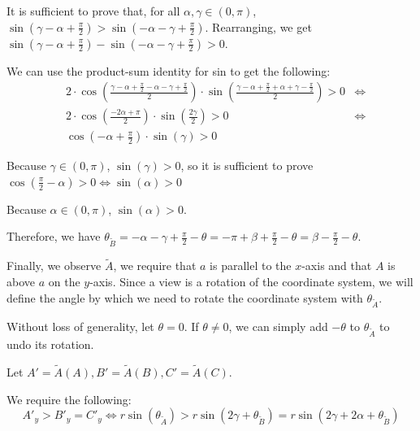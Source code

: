 \documentclass[a4paper,12pt]{article}
\newcommand{\HSview}[1][V]{\widetilde{#1}}
\theoremstyle{definition}
\theoremstyle{plain}
\begin{document}
	It is sufficient to prove that, for all $\alpha, \gamma \in \left(0, \pi\right)$, 
	$\sin\left(\gamma - \alpha + \frac{\pi}{2}\right) >
	 \sin\left(-\alpha - \gamma + \frac{\pi}{2}\right)$.
	Rearranging, we get
	$\sin\left(\gamma - \alpha + \frac{\pi}{2}\right) -
	 \sin\left(-\alpha - \gamma + \frac{\pi}{2}\right) > 0$.
	
	We can use the product-sum identity for sin to get the following:
	\begin{align*}
	& 2\cdot\cos\left(\frac{\gamma - \alpha + \frac{\pi}{2} - \alpha - \gamma + \frac{\pi}{2}}{2}\right) \cdot
		\sin\left(\frac{\gamma - \alpha + \frac{\pi}{2} + \alpha + \gamma - \frac{\pi}{2}}{2}\right) > 0 & \iff \\
	& 2\cdot\cos\left(\frac{-2\alpha + \pi}{2}\right) \cdot
		\sin\left(\frac{2\gamma}{2}\right) > 0 & \iff \\
	& \cos\left(-\alpha + \frac{\pi}{2}\right) \cdot
		\sin\left(\gamma\right) > 0
	\end{align*}

	Because $\gamma \in \left(0, \pi\right)$, $\sin\left(\gamma\right) > 0$, so it is sufficient to prove
	$\cos\left(\frac{\pi}{2} - \alpha\right) > 0 \iff \sin\left(\alpha\right) > 0$
	
	Because $\alpha \in \left(0, \pi\right)$, $\sin\left(\alpha\right) > 0$.

	Therefore, we have $\theta_{\HSview[B]} = -\alpha - \gamma + \frac{\pi}{2} - \theta = -\pi + \beta + \frac{\pi}{2}
	- \theta = \beta - \frac{\pi}{2} - \theta$.

	Finally, we observe $\HSview[A]$, we require that $a$ is parallel to the $x$-axis and that $A$ is above $a$ on the
	$y$-axis. Since a view is a rotation of the coordinate system, we will define the angle by which we need to rotate
	the coordinate system with $\theta_{\HSview[A]}$.
	
	Without loss of generality, let $\theta = 0$. If $\theta \neq 0$, we can
	simply add $-\theta$ to $\theta_{\HSview[A]}$ to undo its rotation.

	Let $A' = \HSview[A]\left(A\right), B' = \HSview[A]\left(B\right), C' = \HSview[A]\left(C\right)$.

	We require the following:
	$$
		A'_y > B'_y = C'_y \iff
		r\sin\left(\theta_{\HSview[A]}\right) >
		r\sin\left(2\gamma + \theta_{\HSview[B]}\right) =
		r\sin\left(2\gamma + 2\alpha + \theta_{\HSview[B]}\right)
	$$
\end{document}
